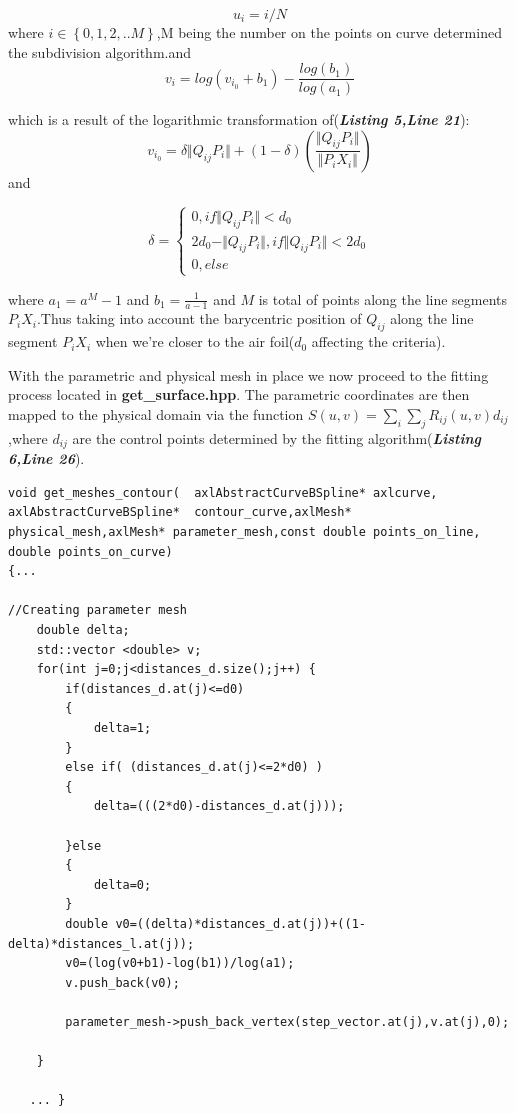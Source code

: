 \documentclass[12pt,a4paper]{article}
\begin{document}
$$u_{i}=i/N$$ 
where $i\in \left\lbrace 0,1,2,..M \right\rbrace  $,M being the number on the points on curve determined the subdivision algorithm.and $$v_{i}=log(v_{i_{0}}+b_1)-\frac{log(b_1)}{log(a_1)}$$

which is a result of the logarithmic transformation of(\textbf{\textit{Listing 5,Line 21}}): $$v_{i_{0}}=\delta\Vert Q_{ij} P_{i}\Vert+(1-\delta)(\frac{\Vert Q_{ij} P_{i}\Vert}{\Vert  P_{i}X_{i}\Vert})$$ and

$$\delta =\begin{cases}0, if  \Vert Q_{ij} P_{i}\Vert <d_{0} \\ 2d_{0}-\Vert Q_{ij} P_{i}\Vert, if \Vert Q_{ij} P_{i}\Vert <2d_{0}\\0 , else
\end{cases}$$

 
 where $a_1=a^{M}-1$  and $b_1=\frac{1}{a-1}$ and $M$ is total of points along the line segments $P_{i}X_{i}$.Thus taking into account the barycentric position of $Q_{ij}$ along the line segment $P_{i}X_{i}$ when we're closer to the air foil($d_0$ affecting the criteria).


With the parametric and physical mesh in place we now proceed to the fitting process located in \textbf{get\_surface.hpp}.
The parametric coordinates are then mapped to the physical domain via the function $S(u,v)=\sum_{i}\sum_{j} R_{ij}(u,v)d_{ij}$ ,where $d_{ij}$ are the control points determined by the fitting algorithm(\textbf{\textit{Listing 6,Line 26}}).



 \begin{lstlisting}[label=some-code,caption=Parametric coordinates]
void get_meshes_contour(  axlAbstractCurveBSpline* axlcurve, axlAbstractCurveBSpline*  contour_curve,axlMesh* physical_mesh,axlMesh* parameter_mesh,const double points_on_line, double points_on_curve)
{... 

//Creating parameter mesh
    double delta;
    std::vector <double> v;
    for(int j=0;j<distances_d.size();j++) {
        if(distances_d.at(j)<=d0)
        {
            delta=1;
        }
        else if( (distances_d.at(j)<=2*d0) )
        {
            delta=(((2*d0)-distances_d.at(j)));

        }else
        {
            delta=0;
        }
        double v0=((delta)*distances_d.at(j))+((1-delta)*distances_l.at(j));
        v0=(log(v0+b1)-log(b1))/log(a1);
        v.push_back(v0);

        parameter_mesh->push_back_vertex(step_vector.at(j),v.at(j),0);

    }
    
   ... }

\end{lstlisting}
\end{document}
